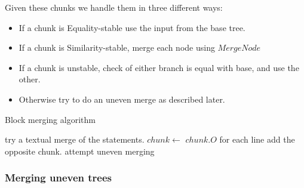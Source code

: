 \documentclass[11pt]{article}
\begin{document}
Given these chunks we handle them in three different ways: 

\begin{itemize}
	\item If a chunk is Equality-stable use the input from the base tree.
	\item If a chunk is Similarity-stable, merge each node using $MergeNode$
	\item If a chunk is unstable, check of either branch is equal with base, and use the other.
	\item Otherwise try to do an uneven merge as described later.
\end{itemize}

\begin{algorithm}
  \caption{Block merging algorithm}
  \label{MergeStatementList}
\begin{algorithmic}
    \State try  a textual merge of the statements.
        \State $chunk \gets $ 
                \State \Return $chunk.O$
                \State for each line \Return {}
                \State add the opposite chunk.
            \Else
                \State attempt uneven merging
            \EndIf
        \EndFor
    \EndIf
\EndFunction
\end{algorithmic}
\end{algorithm}


\subsubsection{Merging uneven trees}
\label{MergingUnevenSection}
\end{document}
